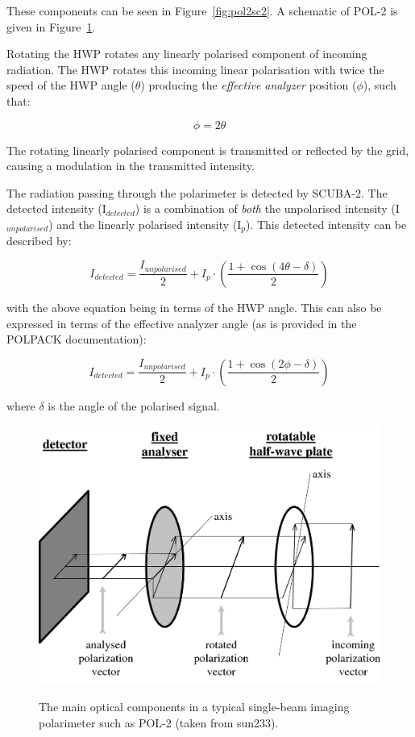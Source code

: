 These components can be seen in Figure~\ref{fig:pol2sc2}.  A schematic
of POL-2 is given in Figure~\ref{fig:pol2sc2diagram}.


Rotating the HWP rotates any linearly polarised component of incoming
radiation. The HWP rotates this incoming linear polarisation with
twice the speed of the HWP angle ($\theta$) producing the
\emph{effective analyzer} position ($\phi$), such that:


\begin{equation}
\phi = 2 \theta
\end{equation}


The rotating linearly polarised component is transmitted or reflected
by the grid, causing a modulation in the transmitted intensity.

The radiation passing through the polarimeter is detected by
SCUBA-2. The detected intensity (I$_{detected}$) is a combination of
\emph{both} the unpolarised intensity (I$_{unpolarised}$) and the
linearly polarised intensity (I$_{p}$). This detected intensity can be
described by:


\begin{equation}
I_{detected} = \frac{I_{unpolarised}}{2}+ I_{p}\cdot\left(\frac{1+\cos(4\theta - \delta)}{2} \right)
\end{equation}

with the above equation being in terms of the HWP angle. This can also
be expressed in terms of the effective analyzer angle (as is provided
in the POLPACK documentation):


\begin{equation}
I_{detected} = \frac{I_{unpolarised}}{2}+ I_{p}\cdot\left(\frac{1+\cos(2\phi - \delta)}{2} \right)
\end{equation}

where $\delta$ is the angle of the polarised signal.


\begin{figure}[t!]
\begin{center}
\includegraphics[width=0.8\linewidth]{singopt.png}
\label{fig:pol2sc2diagram}
\caption [POL-2 optical components]{ The main optical components in a
  typical single-beam imaging polarimeter such as POL-2 (taken from
  sun233).}
\end{center}
\end{figure}

